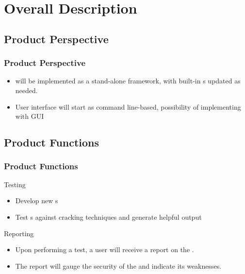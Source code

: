 
\section{Overall Description}


\subsection{Product Perspective}

\begin{frame} %
\frametitle{Product Perspective}
\begin{itemize}
\item \cry{} will be implemented as a stand-alone framework, with built-in \cs s updated as needed.
\item User interface will start as command line-based, possibility of implementing with GUI
\end{itemize}
\end{frame}


\subsection{Product Functions}
\begin{frame}
\frametitle{Product Functions}
Testing
\begin{itemize}
  \item Develop new \cs s
  \item Test \cs s against cracking techniques and generate helpful output
\end{itemize}
Reporting
\begin{itemize}
\item Upon performing a test, a user will receive a report on
  the \cs.
\item The report will gauge the security of the
  \cs{} and indicate its weaknesses.
\end{itemize}
\end{frame}


